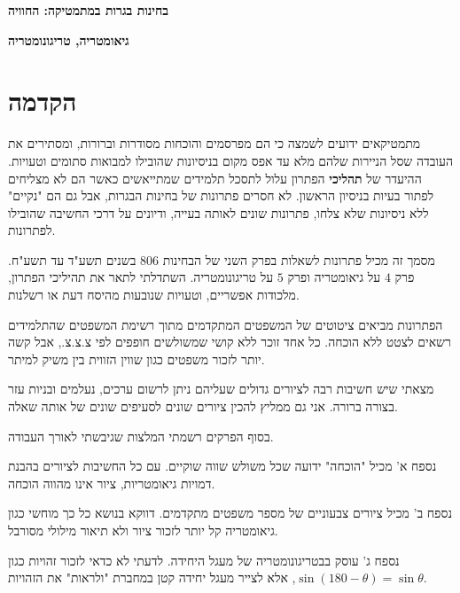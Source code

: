 
\thispagestyle{empty}

\begin{center}
\textbf{\LARGE בחינות בגרות במתמטיקה: החוויה}

\bigskip
\bigskip

\textbf{\LARGE גיאומטריה, טריגונומטריה}
\end{center}



\section*{הקדמה}

מתמטיקאים ידועים לשמצה כי הם מפרסמים והוכחות מסודרות וברורות, ומסתירים את העובדה שסל הניירות שלהם מלא עד אפס מקום בניסיונות שהובילו למבואות סתומים וטעויות. ההיעדר של 
\textbf{תהליכי}
הפתרון עלול לתסכל תלמידים שמתייאשים כאשר הם לא מצליחים לפתור בעיות בניסיון הראשון. לא חסרים פתרונות של בחינות הבגרות, אבל גם הם "נקיים" ללא ניסיונות שלא צלחו, פתרונות שונים לאותה בעייה, ודיונים על דרכי החשיבה שהובילו לפתרונות.

מסמך זה מכיל פתרונות לשאלות בפרק השני של הבחינות 
$806$
בשנים תשע"ד עד תשע"ח. פרק 
$4$
על גיאומטריה ופרק
$5$
על טריגונומטריה. השתדלתי לתאר את תהיליכי הפתרון, מלכודות אפשריים, וטעויות שנובעות מהיסח דעת או רשלנות.

הפתרונות מביאים ציטוטים של המשפטים המתקדמים מתוך רשימת המשפטים שהתלמידים רשאים לצטט ללא הוכחה. כל אחד זוכר ללא קושי שמשולשים חופפים לפי צ.צ.צ., אבל קשה יותר לזכור משפטים כגון שווין הזווית בין משיק למיתר.

מצאתי שיש חשיבות רבה לציורים גדולים שעליהם ניתן לרשום ערכים, נעלמים ובניות עזר בצורה ברורה. אני גם ממליץ להכין ציורים שונים לסעיפים שונים של אותה שאלה.

בסוף הפרקים רשמתי המלצות שגיבשתי לאורך העבודה.

נספח א' מכיל "הוכחה" ידועה שכל משולש שווה שוקיים. עם כל החשיבות לציורים בהבנת דמויות גיאומטריות, ציור אינו מהווה הוכחה.

נספח ב' מכיל ציורים צבעוניים של מספר משפטים מתקדמים. דווקא בנושא כל כך מוחשי כגון גיאומטריה קל יותר לזכור ציור ולא תיאור מילולי מסורבל.

נספח ג' עוסק בבטריגונומטריה של מעגל היחידה. לדעתי לא כדאי לזכור זהויות כגון
$\sin (180-\theta)=\sin \theta$,
אלא לצייר מעגל יחידה קטן במחברת "ולראות" את הזהויות.

\np
\mbox{}
\np
